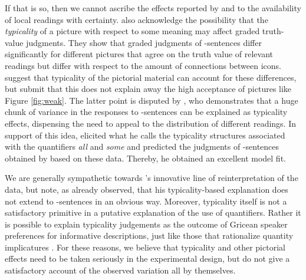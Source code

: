 \documentclass[fleqn,reqno,10pt,draft]{article}
\newcommand{\as}{\acro{as}}
\renewcommand{\es}{\acro{es}}
\begin{document}
If that is so, then we cannot ascribe the effects reported by
\citet{CliftonDube2010:Embedded-Implic} and
\citet{ChemlaSpector2010:Experimental-Ev} to the availability of local
readings with certainty. \citet{ChemlaSpector2010:Experimental-Ev}
also acknowledge the possibility that the \emph{typicality} of a
picture with respect to some meaning may affect graded truth-value
judgments. They show that graded judgments of \as-sentences differ
significantly for different pictures that agree on the truth value of
relevant readings but differ with respect to the amount of connections
between icons. \citeauthor{ChemlaSpector2010:Experimental-Ev} suggest
that typicality of the pictorial material can account for these
differences, but submit that this does not explain away the high
acceptance of pictures like Figure \ref{fig:weak}. The latter point is
disputed by \citet{Tielvan-Tiel2012:Embedded-Scalar}, who demonstrates
that a huge chunk of variance in the responses to \as-sentences can be
explained as typicality effects, dispensing the need to appeal to the
distribution of different readings. In support of this idea,
\citet{Tielvan-Tiel2012:Embedded-Scalar} elicited what he calls the
typicality structures associated with the quantifiers {\it all} and
{\it some} \citep[as done also
by][]{DegenTanenhaus2011:Making-Inferenc} and predicted the judgments
of \as-sentences obtained by
\citeauthor{ChemlaSpector2010:Experimental-Ev} based on these
data. Thereby, he obtained an excellent model fit.

We are generally sympathetic towards
\citeauthor{Tielvan-Tiel2012:Embedded-Scalar}'s innovative line of
reinterpretation of the data, but note, as
\citet{ChemlaSpector2010:Experimental-Ev} already observed, that his
typicality-based explanation does not extend to \es-sentences in an
obvious way. Moreover, typicality itself is not a satisfactory
primitive in a putative explanation of the use of quantifiers. Rather
it is possible to explain typicality judgements as the outcome of
Gricean speaker preferences for informative descriptions, just like
those that rationalize quantity implicatures
\citep{Franke2014:Typical-use-of-}. For these reasons, we believe that
typicality and other pictorial effects need to be taken seriously in
the experimental design, but do not give a satisfactory account of the
observed variation all by themselves.
\end{document}
